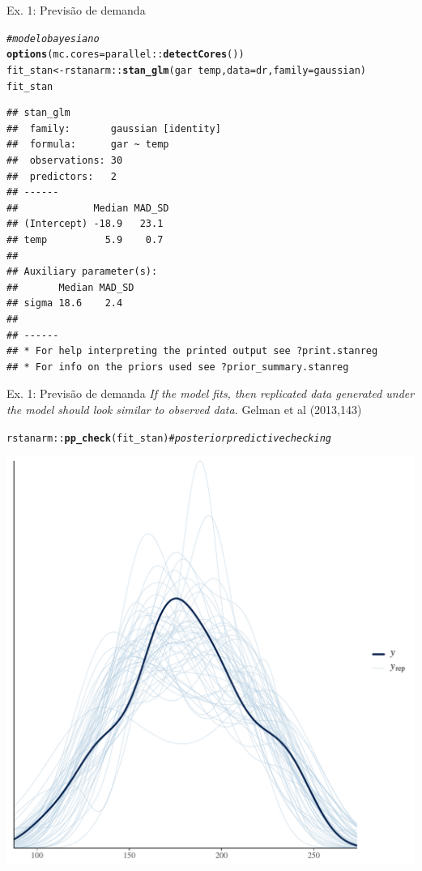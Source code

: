 \documentclass{beamer}\usepackage[]{graphicx}\usepackage[]{xcolor}
\makeatletter
\newcommand{\hlcom}[1]{\textcolor[rgb]{0.678,0.584,0.686}{\textit{#1}}}%
\newcommand{\hlopt}[1]{\textcolor[rgb]{0,0,0}{#1}}%
\newcommand{\hldef}[1]{\textcolor[rgb]{0.345,0.345,0.345}{#1}}%
\newcommand{\hlkwb}[1]{\textcolor[rgb]{0.69,0.353,0.396}{#1}}%
\newcommand{\hlkwc}[1]{\textcolor[rgb]{0.333,0.667,0.333}{#1}}%
\newcommand{\hlkwd}[1]{\textcolor[rgb]{0.737,0.353,0.396}{\textbf{#1}}}%
\newenvironment{kframe}{%
 \def\at@end@of@kframe{}%
 \ifinner\ifhmode%
  \def\at@end@of@kframe{\end{minipage}}%
  \begin{minipage}{\columnwidth}%
 \fi\fi%
 \def\FrameCommand##1{\hskip\@totalleftmargin \hskip-\fboxsep
 \colorbox{shadecolor}{##1}\hskip-\fboxsep
     \hskip-\linewidth \hskip-\@totalleftmargin \hskip\columnwidth}%
 \MakeFramed {\advance\hsize-\width
   \@totalleftmargin\z@ \linewidth\hsize
   \@setminipage}}%
 {\par\unskip\endMakeFramed%
 \at@end@of@kframe}
\newenvironment{knitrout}{}{} %
\makeatother
\begin{document}
\begin{frame}[fragile]{Ex. 1: Previsão de demanda}
\fontsize{8pt}{8pt}\selectfont
\begin{knitrout}
\color{fgcolor}\begin{kframe}
\begin{alltt}
\hlcom{# modelo bayesiano}
\hlkwd{options}\hldef{(}\hlkwc{mc.cores} \hldef{= parallel}\hlopt{::}\hlkwd{detectCores}\hldef{())}
\hldef{fit_stan} \hlkwb{<-} \hldef{rstanarm}\hlopt{::}\hlkwd{stan_glm}\hldef{(gar} \hlopt{~} \hldef{temp,} \hlkwc{data} \hldef{= dr,} \hlkwc{family} \hldef{= gaussian)}
\hldef{fit_stan}
\end{alltt}
\begin{verbatim}
## stan_glm
##  family:       gaussian [identity]
##  formula:      gar ~ temp
##  observations: 30
##  predictors:   2
## ------
##             Median MAD_SD
## (Intercept) -18.9   23.1 
## temp          5.9    0.7 
## 
## Auxiliary parameter(s):
##       Median MAD_SD
## sigma 18.6    2.4  
## 
## ------
## * For help interpreting the printed output see ?print.stanreg
## * For info on the priors used see ?prior_summary.stanreg
\end{verbatim}
\end{kframe}
\end{knitrout}
\end{frame}


\begin{frame}[fragile]{Ex. 1: Previsão de demanda}
\textit{If the model fits, then replicated data generated under the model should look similar to observed data.} Gelman et al (2013,143)
\fontsize{8pt}{8pt}\selectfont
\begin{knitrout}
\color{fgcolor}\begin{kframe}
\begin{alltt}
\hldef{rstanarm}\hlopt{::}\hlkwd{pp_check}\hldef{(fit_stan)} \hlcom{# posterior predictive checking}
\end{alltt}
\end{kframe}

{\centering \includegraphics[width=.5\linewidth]{figure/ppc-1} 

}


\end{knitrout}
\end{frame}
\end{document}
